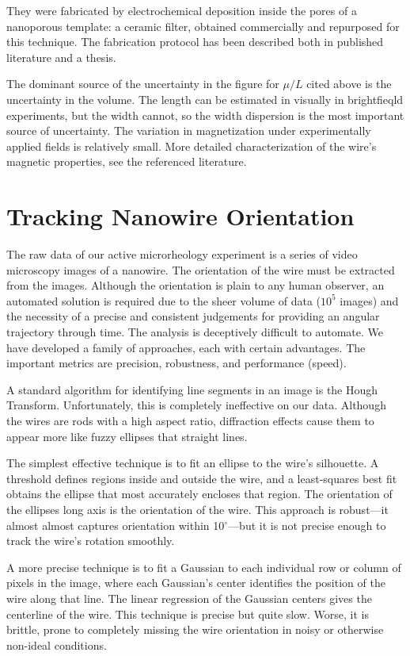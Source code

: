 They were fabricated by electrochemical deposition inside the pores of a nanoporous template: a ceramic filter, obtained commercially and repurposed for this technique. The fabrication protocol has been described both in published literature\cite{Chien2002} and a thesis\cite{TanaseThesis}.

The dominant source of the uncertainty in the figure for $\mu/L$ cited above is the uncertainty in the volume. The length can be estimated in visually in brightfieqld experiments, but the width cannot, so the width dispersion is the most important source of uncertainty. The variation in magnetization under experimentally applied fields is relatively small\cite{Hultgren2004,Hultgren2005}. More detailed characterization of the wire's magnetic properties, see the referenced literature.

\section{Tracking Nanowire Orientation}

The raw data of our active microrheology experiment is a series of video microscopy images of a nanowire. The orientation of the wire must be extracted from the images. Although the orientation is plain to any human observer, an automated solution is required due to the sheer volume of data ($10^5$ images) and the necessity of a precise and consistent judgements for providing an angular trajectory through time. The analysis is deceptively difficult to automate. We have developed a family of approaches, each with certain advantages. The important metrics are precision, robustness, and performance (speed).

A standard algorithm for identifying line segments in an image is the Hough Transform. Unfortunately, this is completely ineffective on our data. Although the wires are rods with a high aspect ratio, diffraction effects cause them to appear more like fuzzy ellipses that straight lines.

The simplest effective technique is to fit an ellipse to the wire's silhouette. A threshold defines regions inside and outside the wire, and a least-squares best fit obtains the ellipse that most accurately encloses that region. The orientation of the ellipses long axis is the orientation of the wire. This approach is robust---it almost almost captures orientation within 10$^\circ$---but it is not precise enough to track the wire's rotation smoothly.

A more precise technique is to fit a Gaussian to each individual row or column of pixels in the image, where each Gaussian's center identifies the position of the wire along that line. The linear regression of the Gaussian centers gives the centerline of the wire. This technique is precise but quite slow. Worse, it is brittle, prone to completely missing the wire orientation in noisy or otherwise non-ideal conditions.

